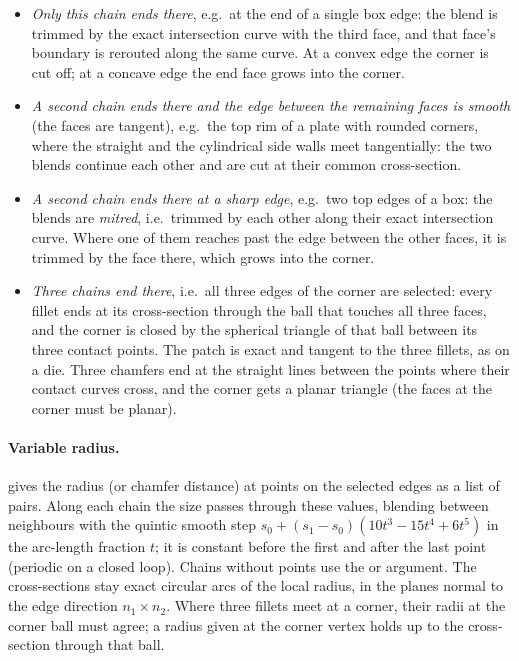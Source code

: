 \begin{itemize}
  \item \emph{Only this chain ends there}, e.g.\ at the end of a single box edge: the blend
    is trimmed by the exact intersection curve with the third face, and that face's boundary is
    rerouted along the same curve. At a convex edge the corner is cut off; at a concave edge
    the end face grows into the corner.
  \item \emph{A second chain ends there and the edge between the remaining faces is smooth}
    (the faces are tangent), e.g.\ the top rim of a plate with rounded corners, where the
    straight and the cylindrical side walls meet tangentially: the two blends continue each
    other and are cut at their common cross-section.
  \item \emph{A second chain ends there at a sharp edge}, e.g.\ two top edges of a box: the
    blends are \emph{mitred}, i.e.\ trimmed by each other along their exact intersection
    curve. Where one of them reaches past the edge between the other faces, it is trimmed by
    the face there, which grows into the corner.
  \item \emph{Three chains end there}, i.e.\ all three edges of the corner are selected:
    every fillet ends at its cross-section through the ball that touches all three faces, and
    the corner is closed by the spherical triangle of that ball between its three contact
    points. The patch is exact and tangent to the three fillets, as on a die. Three chamfers
    end at the straight lines between the points where their contact curves cross, and the
    corner gets a planar triangle (the faces at the corner must be planar).
\end{itemize}

\paragraph{Variable radius.}  gives the radius (or chamfer distance) at points
on the selected edges as a list of  pairs. Along each chain the size passes
through these values, blending between neighbours with the quintic smooth step $s_0 + (s_1 -
s_0)(10t^3 - 15t^4 + 6t^5)$ in the arc-length fraction $t$; it is constant before the first
and after the last point (periodic on a closed loop). Chains without points use the
 or  argument. The cross-sections stay exact circular arcs of the
local radius, in the planes normal to the edge direction $n_1 \times n_2$. Where three fillets
meet at a corner, their radii at the corner ball must agree; a radius given at the corner
vertex holds up to the cross-section through that ball.

